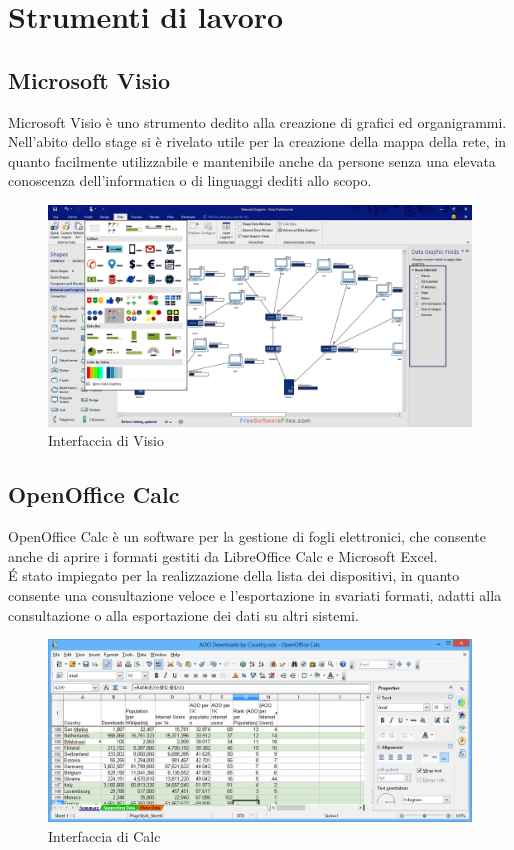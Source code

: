 \documentclass[Tesi.tex]{subfiles}
\begin{document}
\newpage
\section{Strumenti di lavoro}

\subsection{Microsoft Visio}
Microsoft Visio è uno strumento dedito alla creazione di grafici ed organigrammi. \\
Nell'abito dello stage si è rivelato utile per la creazione della mappa della rete, in quanto facilmente utilizzabile e mantenibile anche da persone senza una elevata conoscenza dell'informatica o di linguaggi dediti allo scopo.
\begin{figure}[H]
	\centering
	\includegraphics[width=0.7\linewidth]{"images/Visio_esempio"}
	\caption{Interfaccia di Visio}
	\label{fig:Interfaccia di Visio}
\end{figure}

\subsection{OpenOffice Calc}
OpenOffice Calc è un software per la gestione di fogli elettronici, che consente anche di aprire i formati gestiti da LibreOffice Calc e Microsoft Excel. \\
\'E stato impiegato per la realizzazione della lista dei dispositivi, in quanto consente una consultazione veloce e l'esportazione in svariati formati, adatti alla consultazione o alla esportazione dei dati su altri sistemi.
\begin{figure}[H]
	\centering
	\includegraphics[width=0.7\linewidth]{"images/screen_calc"}
	\caption{Interfaccia di Calc}
	\label{fig:Interfaccia di Calc}
\end{figure}
\end{document}
